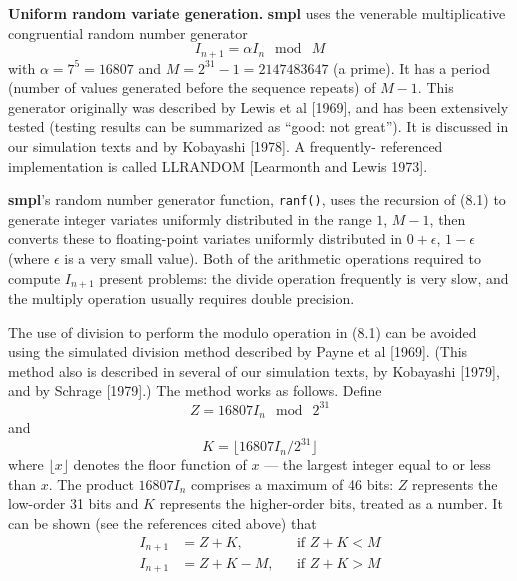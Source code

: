 \textbf{Uniform random variate generation.} \textbf{smpl} uses the venerable multiplicative
congruential random number generator
\begin{equation}
I_{n+1}=\alpha I_n\ \bmod\ M
\end{equation}
with $\alpha=7^5=16807$ and $M=2^{31}-1=2147483647$ (a prime). It has a period
(number of values generated before the sequence repeats) of $M-1$. This
generator originally was described by Lewis et al [1969], and has been
extensively tested (testing results can be summarized as ``good: not great'').
It is discussed in our simulation texts and by Kobayashi [1978]. A frequently-
referenced implementation is called LLRANDOM [Learmonth and Lewis
1973].

\textbf{smpl}'s random number generator function, \texttt{ranf()}, uses the recursion of
(8.1) to generate integer variates uniformly distributed in the range $1$, $M-1$,
then converts these to floating-point variates uniformly distributed in $0+\epsilon$,
$1-\epsilon$ (where $\epsilon$ is a very small value). Both of the arithmetic operations
required to compute $I_{n+1}$ present problems: the divide operation frequently is
very slow, and the multiply operation usually requires double precision.

The use of division to perform the modulo operation in (8.1) can be
avoided using the simulated division method described by Payne et al [1969].
(This method also is described in several of our simulation texts, by
Kobayashi [1979], and by Schrage [1979].) The method works as follows.
Define
\begin{equation}
Z=16807I_n\ \bmod\ 2^{31}
\end{equation}
and
\begin{equation}
K=\lfloor 16807I_n/2^{31}\rfloor
\end{equation}
where $\lfloor x\rfloor$ denotes the floor function of $x$ --- the largest integer equal to or less
than $x$. The product $16807I_n$ comprises a maximum of 46 bits: $Z$ represents the
low-order 31 bits and $K$ represents the higher-order bits, treated as a number.
It can be shown (see the references cited above) that
\begin{equation}
\begin{aligned}
I_{n+1}&=Z+K, &&\text{if }Z+K<M\\
I_{n+1}&=Z+K-M, &&\text{if }Z+K>M
\end{aligned}
\end{equation}

